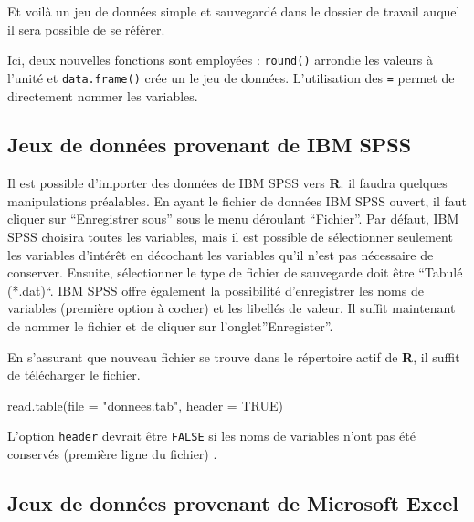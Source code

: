 \documentclass[
]{book}
\newenvironment{Shaded}{}{}
\newcommand{\AttributeTok}[1]{#1}
\newcommand{\ConstantTok}[1]{#1}
\newcommand{\FunctionTok}[1]{#1}
\newcommand{\NormalTok}[1]{#1}
\newcommand{\StringTok}[1]{#1}
\begin{document}
Et voilà un jeu de données simple et sauvegardé dans le dossier de travail auquel il sera possible de se référer.

Ici, deux nouvelles fonctions sont employées : \texttt{round()} arrondie les valeurs à l'unité et \texttt{data.frame()} crée un le jeu de données. L'utilisation des \texttt{=} permet de directement nommer les variables.

\hypertarget{jeux-de-donnuxe9es-provenant-de-ibm-spss}{%
\subsection{Jeux de données provenant de IBM SPSS}\label{jeux-de-donnuxe9es-provenant-de-ibm-spss}}

Il est possible d'importer des données de IBM SPSS vers \textbf{R}. il faudra quelques manipulations préalables. En ayant le fichier de données IBM SPSS ouvert, il faut cliquer sur ``Enregistrer sous'' sous le menu déroulant ``Fichier''. Par défaut, IBM SPSS choisira toutes les variables, mais il est possible de sélectionner seulement les variables d'intérêt en décochant les variables qu'il n'est pas nécessaire de conserver. Ensuite, sélectionner le type de fichier de sauvegarde doit être ``Tabulé (*.dat)``. IBM SPSS offre également la possibilité d'enregistrer les noms de variables (première option à cocher) et les libellés de valeur. Il suffit maintenant de nommer le fichier et de cliquer sur l'onglet''Enregister''.

En s'assurant que nouveau fichier se trouve dans le répertoire actif de \textbf{R}, il suffit de télécharger le fichier.

\begin{Shaded}
\begin{Highlighting}[]
\FunctionTok{read.table}\NormalTok{(}\AttributeTok{file =} \StringTok{"donnees.tab"}\NormalTok{, }\AttributeTok{header =} \ConstantTok{TRUE}\NormalTok{)}
\end{Highlighting}
\end{Shaded}

L'option \texttt{header} devrait être \texttt{FALSE} si les noms de variables n'ont pas été conservés (première ligne du fichier) .

\hypertarget{jeux-de-donnuxe9es-provenant-de-microsoft-excel}{%
\subsection{Jeux de données provenant de Microsoft Excel}\label{jeux-de-donnuxe9es-provenant-de-microsoft-excel}}
\end{document}
